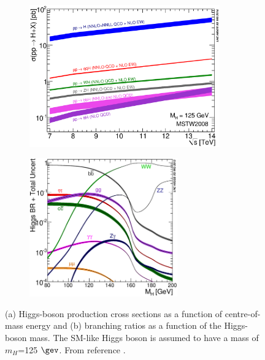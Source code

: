 \begin{figure}[htb!]
\begin{subfigure}{0.5\textwidth}
  \centering
  \includegraphics[width=0.9\textwidth]{figures/Theory/higgsxsec.eps}
  \caption{}
  \label{fig:theo:higgsxsec}
\end{subfigure}
\begin{subfigure}{0.5\textwidth}
  \centering
  \includegraphics[width=0.7\textwidth]{figures/Theory/HiggsBR.eps}
  \caption{}
  \label{fig:theo:higgsbr}
\end{subfigure}

\captionsetup{width=0.85\textwidth} \caption{\small (a) Higgs-boson production cross sections  as a function of centre-of-mass energy and (b) branching ratios as a function of the Higgs-boson mass. The SM-like Higgs boson is assumed to have a mass of $m_{H}$=125 $\gev$. From reference \cite{lhcxs}.}
\label{fig:theo:higgsxsecbr}
\end{figure}


